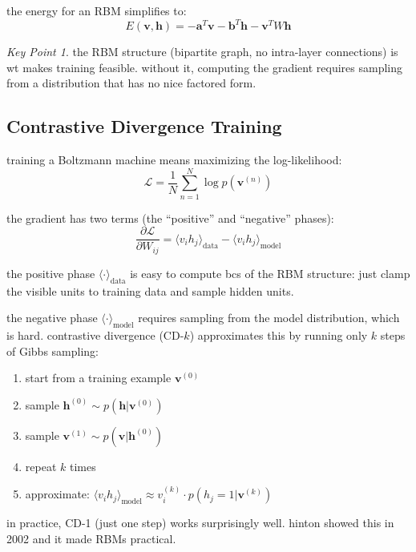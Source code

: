\documentclass[11pt,a4paper]{article}
\theoremstyle{definition}
\theoremstyle{remark}
\newtheorem*{keypoint}{Key Point}
\begin{document}
the energy for an RBM simplifies to:
\[
E(\mathbf{v}, \mathbf{h}) = -\mathbf{a}^T \mathbf{v} - \mathbf{b}^T \mathbf{h} - \mathbf{v}^T W \mathbf{h}
\]

\begin{keypoint}
the RBM structure (bipartite graph, no intra-layer connections) is wt makes training feasible. without it, computing the gradient requires sampling from a distribution that has no nice factored form.
\end{keypoint}

\subsection{Contrastive Divergence Training}

training a Boltzmann machine means maximizing the log-likelihood:
\[
\mathcal{L} = \frac{1}{N} \sum_{n=1}^{N} \log p(\mathbf{v}^{(n)})
\]

the gradient has two terms (the ``positive'' and ``negative'' phases):
\[
\frac{\partial \mathcal{L}}{\partial W_{ij}} = \langle v_i h_j \rangle_{\text{data}} - \langle v_i h_j \rangle_{\text{model}}
\]

the positive phase $\langle \cdot \rangle_{\text{data}}$ is easy to compute bcs of the RBM structure: just clamp the visible units to training data and sample hidden units.

the negative phase $\langle \cdot \rangle_{\text{model}}$ requires sampling from the model distribution, which is hard. contrastive divergence (CD-$k$) approximates this by running only $k$ steps of Gibbs sampling:

\begin{enumerate}[label=\arabic*.]
    \item start from a training example $\mathbf{v}^{(0)}$
    \item sample $\mathbf{h}^{(0)} \sim p(\mathbf{h} | \mathbf{v}^{(0)})$
    \item sample $\mathbf{v}^{(1)} \sim p(\mathbf{v} | \mathbf{h}^{(0)})$
    \item repeat $k$ times
    \item approximate: $\langle v_i h_j \rangle_{\text{model}} \approx v_i^{(k)} \cdot p(h_j = 1 | \mathbf{v}^{(k)})$
\end{enumerate}

in practice, CD-1 (just one step) works surprisingly well. hinton showed this in 2002 and it made RBMs practical.

\end{document}
